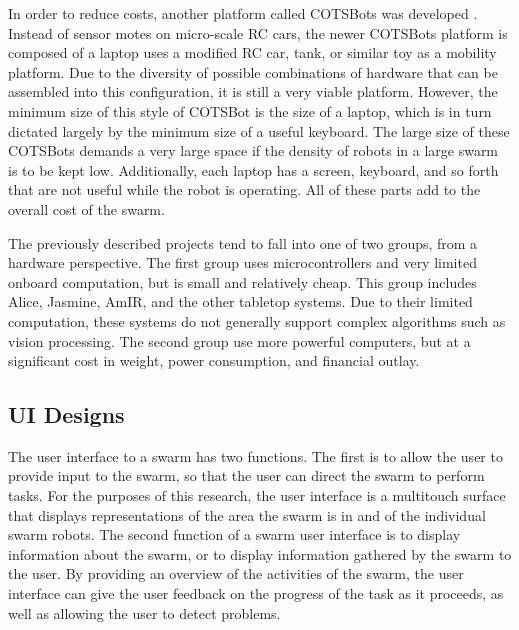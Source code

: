\documentclass[]{article}
\begin{document}
In order to reduce costs, another platform called COTSBots was developed \cite{soule2011cotsbots}.  
Instead of sensor motes on micro-scale RC cars, the newer COTSBots platform is composed of a laptop uses a modified RC car, tank, or similar toy as a mobility platform.
Due to the diversity of possible combinations of hardware that can be assembled into this configuration, it is still a very viable platform. 
However, the minimum size of this style of COTSBot is the size of a laptop, which is in turn dictated largely by the minimum size of a useful keyboard. 
The large size of these COTSBots demands a very large space if the density of robots in a large swarm is to be kept low. 
Additionally, each laptop has a screen, keyboard, and so forth that are not useful while the robot is operating. 
All of these parts add to the overall cost of the swarm. 

The previously described projects tend to fall into one of two groups, from a hardware perspective. 
The first group uses microcontrollers and very limited onboard computation, but is small and relatively cheap.
This group includes Alice, Jasmine, AmIR, and the other tabletop systems. 
Due to their limited computation, these systems do not generally support complex algorithms such as vision processing. 
The second group use more powerful computers, but at a significant cost in weight, power consumption, and financial outlay.


\subsection{UI Designs}

The user interface to a swarm has two functions. 
The first is to allow the user to provide input to the swarm, so that the user can direct the swarm to perform tasks. 
For the purposes of this research, the user interface is a multitouch surface  that displays representations of the area the swarm is in and of the individual swarm robots. 
The second function of a swarm user interface is to display information about the swarm, or to display information gathered by the swarm to the user. 
By providing an overview of the activities of the swarm, the user interface can give the user feedback on the progress of the task as it proceeds, as well as allowing the user to detect problems. 
\end{document}
